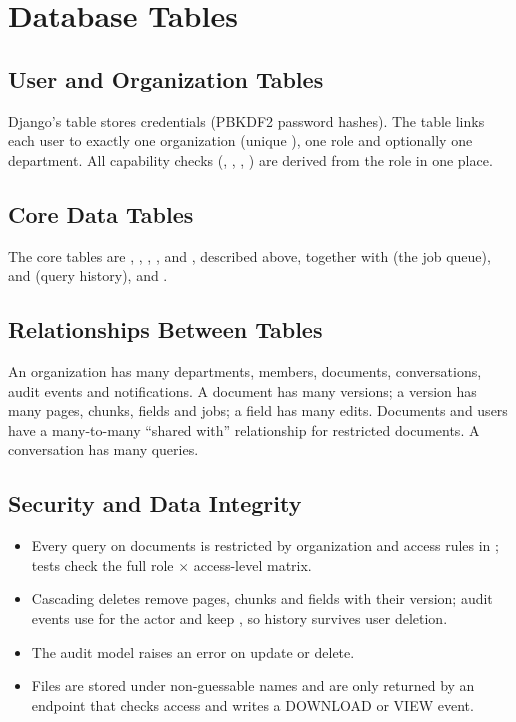 \section{Database Tables}
\subsection{User and Organization Tables}
Django's  table stores credentials (PBKDF2 password hashes). The
 table links each user to exactly one organization (unique
), one role and optionally one department. All capability checks
(, , , ) are
derived from the role in one place.

\subsection{Core Data Tables}
The core tables are , , , ,
 and , described above, together with  (the job
queue),  and  (query history),  and
.

\subsection{Relationships Between Tables}
An organization has many departments, members, documents, conversations, audit events and
notifications. A document has many versions; a version has many pages, chunks, fields and jobs; a field
has many edits. Documents and users have a many-to-many ``shared with'' relationship for restricted
documents. A conversation has many queries.

\subsection{Security and Data Integrity}
\begin{itemize}
\item Every query on documents is restricted by organization and access rules in
; tests check the full role $\times$ access-level matrix.
\item Cascading deletes remove pages, chunks and fields with their version; audit events use
 for the actor and keep , so history survives user deletion.
\item The audit model raises an error on update or delete.
\item Files are stored under non-guessable names and are only returned by an endpoint that checks access
and writes a DOWNLOAD or VIEW event.
\end{itemize}

